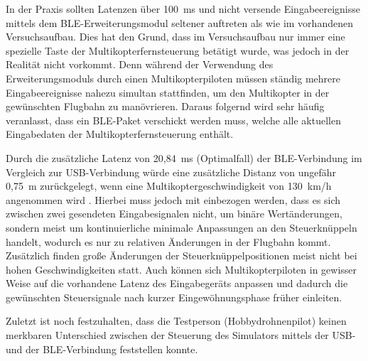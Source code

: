 In der Praxis sollten Latenzen über 100~ms und nicht versende Eingabeereignisse mittels dem \ac{BLE}-Erweiterungsmodul seltener auftreten als wie im vorhandenen Versuchsaufbau. Dies hat den Grund, dass im Versuchsaufbau nur immer eine spezielle Taste der Multikopterfernsteuerung betätigt wurde, was jedoch in der Realität nicht vorkommt. Denn während der Verwendung des Erweiterungsmoduls durch einen Multikopterpiloten müssen ständig mehrere Eingabeereignisse nahezu simultan stattfinden, um den Multikopter in der gewünschten Flugbahn zu manövrieren. Daraus folgernd wird sehr häufig veranlasst, dass ein \ac{BLE}-Paket verschickt werden muss, welche alle aktuellen Eingabedaten der Multikopterfernsteuerung enthält.

Durch die zusätzliche Latenz von 20,84~ms (Optimalfall) der \ac{BLE}-Verbindung im Vergleich zur USB-Verbindung würde eine zusätzliche Distanz von ungefähr 0,75~m zurückgelegt, wenn eine Multikoptergeschwindigkeit von 130~km/h angenommen wird \cites{droneSpeed1}{droneSpeed2}{droneSpeed3}. Hierbei muss jedoch mit einbezogen werden, dass es sich zwischen zwei gesendeten Eingabesignalen nicht, um binäre Wertänderungen, sondern meist um kontinuierliche minimale Anpassungen an den Steuerknüppeln handelt, wodurch es nur zu relativen Änderungen in der Flugbahn kommt. Zusätzlich finden große Änderungen der Steuerknüppelpositionen meist nicht bei hohen Geschwindigkeiten statt. Auch können sich Multikopterpiloten in gewisser Weise auf die vorhandene Latenz des Eingabegeräts anpassen und dadurch die gewünschten Steuersignale nach kurzer Eingewöhnungsphase früher einleiten.

Zuletzt ist noch festzuhalten, dass die Testperson (Hobbydrohnenpilot) keinen merkbaren Unterschied zwischen der Steuerung des Simulators mittels der USB- und der \ac{BLE}-Verbindung feststellen konnte.